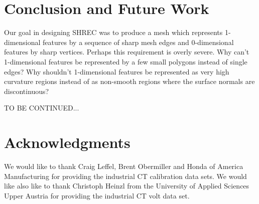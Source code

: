 
\section{Conclusion and Future Work}
\label{section:conclusion}

Our goal in designing SHREC was to produce a mesh
which represents 1-dimensional features by a sequence
of sharp mesh edges and 0-dimensional features by sharp vertices.
Perhaps this requirement is overly severe.
Why can't 1-dimensional features be represented by a few small polygons
instead of single edges?
Why shouldn't 1-dimensional features be represented 
as very high curvature regions instead of as non-smooth regions 
where the surface normals are discontinuous?

TO BE CONTINUED...

\section{Acknowledgments}

We would like to thank Craig Leffel, Brent Obermiller 
and Honda of America Manufacturing
for providing the industrial CT calibration data sets.
We would like also like to thank Christoph Heinzl
from the University of Applied Sciences Upper Austria
for providing the industrial CT volt data set.

